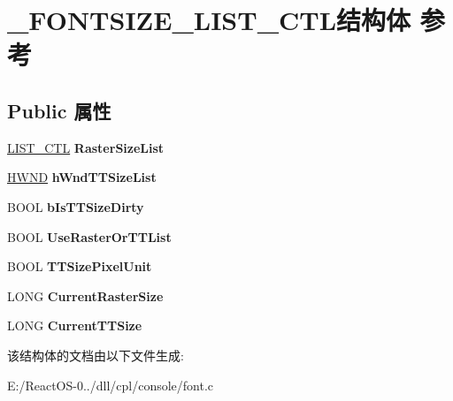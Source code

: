\hypertarget{struct___f_o_n_t_s_i_z_e___l_i_s_t___c_t_l}{}\section{\+\_\+\+F\+O\+N\+T\+S\+I\+Z\+E\+\_\+\+L\+I\+S\+T\+\_\+\+C\+T\+L结构体 参考}
\label{struct___f_o_n_t_s_i_z_e___l_i_s_t___c_t_l}
\subsection*{Public 属性}
\begin{DoxyCompactItemize}
\item 
\mbox{\label{struct___f_o_n_t_s_i_z_e___l_i_s_t___c_t_l_a282676365767786df11d136d7747f20f}} 
\hyperlink{struct___l_i_s_t___c_t_l}{L\+I\+S\+T\+\_\+\+C\+TL} {\bfseries Raster\+Size\+List}
\item 
\mbox{\label{struct___f_o_n_t_s_i_z_e___l_i_s_t___c_t_l_a3de6387b77a2b36141e649315d7362bd}} 
\hyperlink{interfacevoid}{H\+W\+ND} {\bfseries h\+Wnd\+T\+T\+Size\+List}
\item 
\mbox{\label{struct___f_o_n_t_s_i_z_e___l_i_s_t___c_t_l_a46f8dbcfac80e95c9f134b045d71379f}} 
B\+O\+OL {\bfseries b\+Is\+T\+T\+Size\+Dirty}
\item 
\mbox{\label{struct___f_o_n_t_s_i_z_e___l_i_s_t___c_t_l_a29750ebd3e9a4cb4a4961a74a83ecf5b}} 
B\+O\+OL {\bfseries Use\+Raster\+Or\+T\+T\+List}
\item 
\mbox{\label{struct___f_o_n_t_s_i_z_e___l_i_s_t___c_t_l_a8103ceebbbc00ac7e9d239bfed72d950}} 
B\+O\+OL {\bfseries T\+T\+Size\+Pixel\+Unit}
\item 
\mbox{\label{struct___f_o_n_t_s_i_z_e___l_i_s_t___c_t_l_a12820d0fd98decd7da12df7d183c87f3}} 
L\+O\+NG {\bfseries Current\+Raster\+Size}
\item 
\mbox{\label{struct___f_o_n_t_s_i_z_e___l_i_s_t___c_t_l_a907a0c0710d10a9d6ed25203ae5c0e92}} 
L\+O\+NG {\bfseries Current\+T\+T\+Size}
\end{DoxyCompactItemize}


该结构体的文档由以下文件生成\+:\begin{DoxyCompactItemize}
\item 
E\+:/\+React\+O\+S-\/0../dll/cpl/console/font.\+c\end{DoxyCompactItemize}

